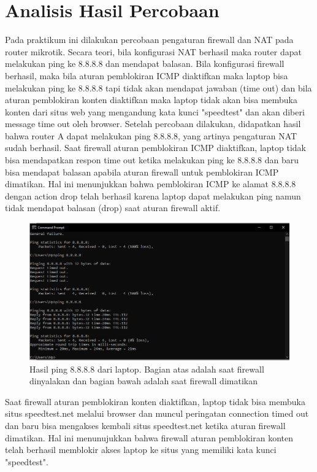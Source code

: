 \section{Analisis Hasil Percobaan}
Pada praktikum ini dilakukan percobaan pengaturan firewall dan NAT pada router mikrotik. Secara teori, bila konfigurasi NAT berhasil maka router dapat melakukan ping ke 8.8.8.8 dan mendapat balasan. Bila konfigurasi firewall berhasil, maka bila aturan pemblokiran ICMP diaktifkan maka laptop bisa melakukan ping ke 8.8.8.8 tapi tidak akan mendapat jawaban (time out) dan bila aturan pemblokiran konten diaktifkan maka laptop tidak akan bisa membuka konten dari situs web yang mengandung kata kunci "speedtest" dan akan diberi message time out oleh browser. Setelah percobaan dilakukan, didapatkan hasil bahwa router A dapat melakukan ping 8.8.8.8, yang artinya pengaturan NAT sudah berhasil. Saat firewall aturan pemblokiran ICMP diaktifkan, laptop tidak bisa mendapatkan respon time out ketika melakukan ping ke 8.8.8.8 dan baru bisa mendapat balasan apabila aturan firewall untuk pemblokiran ICMP dimatikan. Hal ini menunjukkan bahwa pemblokiran ICMP ke alamat 8.8.8.8 dengan action drop telah berhasil karena laptop dapat melakukan ping namun tidak mendapat balasan (drop) saat aturan firewall aktif.\begin{figure}[H]
	\centering
		\includegraphics[width=\linewidth]{P4/img/ping fw off.jpg}
		\caption{Hasil ping 8.8.8.8 dari laptop. Bagian atas adalah saat firewall dinyalakan dan bagian bawah adalah saat firewall dimatikan\label{fig:konfigurasiR1}}
\end{figure}
Saat firewall aturan pemblokiran konten diaktifkan, laptop tidak bisa membuka situs speedtest.net melalui browser dan muncul peringatan connection timed out dan baru bisa mengakses kembali situs speedtest.net ketika aturan firewall dimatikan. Hal ini menunujukkan bahwa firewall aturan pemblokiran konten telah berhasil memblokir akses laptop ke situs yang memiliki kata kunci "speedtest".
